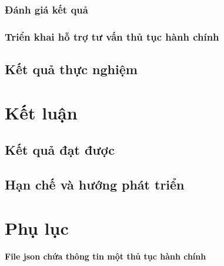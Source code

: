 \documentclass[a4paper, 12pt, openany]{book}
\begin{document}
\subsection{Đánh giá kết quả}

\subsection{Triển khai hỗ trợ tư vấn thủ tục hành chính}

\section{Kết quả thực nghiệm}

\chapter{Kết luận}
\section{Kết quả đạt được}

\section{Hạn chế và hướng phát triển}

\printbibliography

\chapter*{Phụ lục}

\textbf{File json chứa thông tin một thủ tục hành chính}
\end{document}
